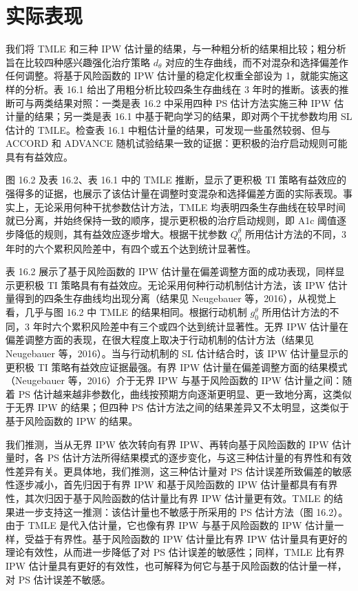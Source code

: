 \section{实际表现}

我们将 TMLE 和三种 IPW 估计量的结果，与一种粗分析的结果相比较；粗分析旨在比较四种感兴趣强化治疗策略 $d_\theta$ 对应的生存曲线，而不对混杂和选择偏差作任何调整。将基于风险函数的 IPW 估计量的稳定化权重全部设为 1，就能实施这样的分析。表 16.1 给出了用粗分析比较四条生存曲线在 3 年时的推断。该表的推断可与两类结果对照：一类是表 16.2 中采用四种 PS 估计方法实施三种 IPW 估计量的结果；另一类是表 16.1 中基于靶向学习的结果，即对两个干扰参数均用 SL 估计的 TMLE。检查表 16.1 中粗估计量的结果，可发现一些虽然较弱、但与 ACCORD 和 ADVANCE 随机试验结果一致的证据：更积极的治疗启动规则可能具有有益效应。



图 16.2 及表 16.2、表 16.1 中的 TMLE 推断，显示了更积极 TI 策略有益效应的强得多的证据，也展示了该估计量在调整时变混杂和选择偏差方面的实际表现。事实上，无论采用何种干扰参数估计方法，TMLE 均表明四条生存曲线在较早时间就已分离，并始终保持一致的顺序，提示更积极的治疗启动规则，即 A1c 阈值逐步降低的规则，其有益效应逐步增大。根据干扰参数 $Q_0^\theta$ 所用估计方法的不同，3 年时的六个累积风险差中，有四个或五个达到统计显著性。

表 16.2 展示了基于风险函数的 IPW 估计量在偏差调整方面的成功表现，同样显示更积极 TI 策略具有有益效应。无论采用何种行动机制估计方法，该 IPW 估计量得到的四条生存曲线均出现分离（结果见 Neugebauer 等，2016），从视觉上看，几乎与图 16.2 中 TMLE 的结果相同。根据行动机制 $g_0^\theta$ 所用估计方法的不同，3 年时六个累积风险差中有三个或四个达到统计显著性。无界 IPW 估计量在偏差调整方面的表现，在很大程度上取决于行动机制的估计方法（结果见 Neugebauer 等，2016）。当与行动机制的 SL 估计结合时，该 IPW 估计量显示的更积极 TI 策略有益效应证据最强。有界 IPW 估计量在偏差调整方面的结果模式（Neugebauer 等，2016）介于无界 IPW 与基于风险函数的 IPW 估计量之间：随着 PS 估计越来越非参数化，曲线按预期方向逐渐更明显、更一致地分离，这类似于无界 IPW 的结果；但四种 PS 估计方法之间的结果差异又不太明显，这类似于基于风险函数的 IPW 的结果。

我们推测，当从无界 IPW 依次转向有界 IPW、再转向基于风险函数的 IPW 估计量时，各 PS 估计方法所得结果模式的逐步变化，与这三种估计量的有界性和有效性差异有关。更具体地，我们推测，这三种估计量对 PS 估计误差所致偏差的敏感性逐步减小，首先归因于有界 IPW 和基于风险函数的 IPW 估计量都具有有界性，其次归因于基于风险函数的估计量比有界 IPW 估计量更有效。TMLE 的结果进一步支持这一推测：该估计量也不敏感于所采用的 PS 估计方法（图 16.2）。由于 TMLE 是代入估计量，它也像有界 IPW 与基于风险函数的 IPW 估计量一样，受益于有界性。基于风险函数的 IPW 估计量比有界 IPW 估计量具有更好的理论有效性，从而进一步降低了对 PS 估计误差的敏感性；同样，TMLE 比有界 IPW 估计量具有更好的有效性，也可解释为何它与基于风险函数的估计量一样，对 PS 估计误差不敏感。


